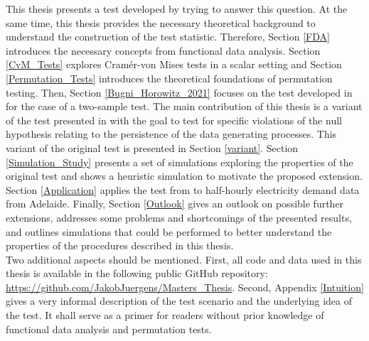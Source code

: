 \documentclass[12pt, a4paper]{article}
\theoremstyle{MAstyle} \newtheorem{assumption}{Assumption}[section]
\theoremstyle{MAstyle} \newtheorem{definition}{Definition}[section]
\theoremstyle{MAstyle} \newtheorem{theorem}{Theorem}[section]
\begin{document}
		This thesis presents a test developed by \cite{bugni_permutation_2021} trying to answer this question. At the same time, this thesis provides the necessary theoretical background to understand the construction of the test statistic. Therefore, Section \ref{FDA} introduces the necessary concepts from functional data analysis. 
		Section \ref{CvM_Tests} explores Cram\'{e}r-von Mises tests in a scalar setting and Section \ref{Permutation_Tests} introduces the theoretical foundations of permutation testing.
		Then, Section \ref{Bugni_Horowitz_2021} focuses on the test developed in \cite{bugni_permutation_2021} for the case of a two-sample test.
		The main contribution of this thesis is a variant of the test presented in \cite{bugni_permutation_2021} with the goal to test for specific violations of the null hypothesis relating to the persistence of the data generating processes. This variant of the original test is presented in Section \ref{variant}.
		Section \ref{Simulation_Study} presents a set of simulations exploring the properties of the original test and shows a heuristic simulation to motivate the proposed extension. 
		Section \ref{Application} applies the test from \cite{bugni_permutation_2021} to half-hourly electricity demand data from Adelaide.
		Finally, Section \ref{Outlook} gives an outlook on possible further extensions, addresses some problems and shortcomings of the presented results, and outlines simulations that could be performed to better understand the properties of the procedures described in this thesis.\\
		
		Two additional aspects should be mentioned. First, all code and data used in this thesis is available in the following public GitHub repository: \url{https://github.com/JakobJuergens/Masters_Thesis}. 
		Second, Appendix \ref{Intuition} gives a very informal description of the test scenario and the underlying idea of the test. It shall serve as a primer for readers without prior knowledge of functional data analysis and permutation tests. 
	
	\newpage
\end{document}
